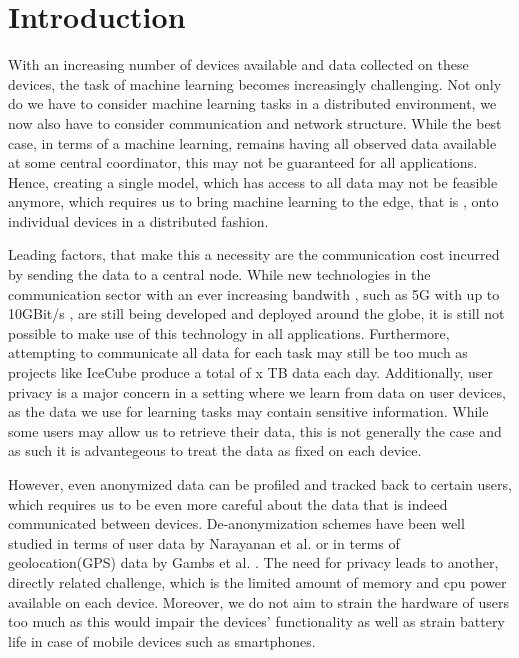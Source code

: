 \chapter{Introduction}
With an increasing number of devices available and data collected on these devices, the task of machine learning becomes increasingly challenging.
Not only do we have to consider machine learning tasks in a distributed environment, we now also have to consider communication and network structure.
While the best case, in terms of a machine learning, remains having all observed data available at some central coordinator, this may not be guaranteed for all applications.
Hence, creating a single model, which has access to all data may not be feasible anymore, which requires us to bring machine learning to the edge, that is , onto individual devices in a distributed fashion.

Leading factors, that make this a necessity are the communication cost incurred by sending the data to a central node.
While new technologies in the communication sector with an ever increasing bandwith , such as 5G with up to 10GBit/s \cite{nordrum2017ieee}, are still being developed and deployed around the globe, it is still not possible to make use of this technology in all applications. 
Furthermore, attempting to communicate all data for each task may still be too much as projects like IceCube produce a total of x TB data each day.
Additionally, user privacy is a major concern in a setting where we learn from data on user devices, as the data we use for learning tasks may contain sensitive information.
While some users may allow us to retrieve their data, this is not generally the case and as such it is advantegeous to treat the data as fixed on each device.   

However, even anonymized data can be profiled and tracked back to certain users, which requires us to be even more careful about the data that is indeed communicated between devices.
De-anonymization schemes have been well studied in terms of user data by Narayanan et al. \cite{narayanan2008robust} or in terms of geolocation(GPS) data by Gambs et al. \cite{gambs2014anonymization}.
The need for privacy leads to another, directly related challenge, which is the limited amount of memory and cpu power available on each device.
Moreover, we do not aim to strain the hardware of users too much as this would impair the devices' functionality as well as strain battery life in case of mobile devices such as smartphones.

